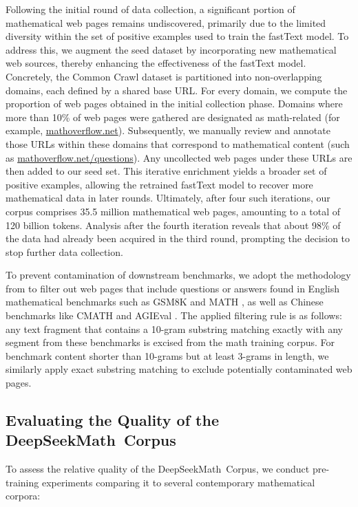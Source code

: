 Following the initial round of data collection, a significant portion of mathematical web pages remains undiscovered, primarily due to the limited diversity within the set of positive examples used to train the fastText model. To address this, we augment the seed dataset by incorporating new mathematical web sources, thereby enhancing the effectiveness of the fastText model. Concretely, the Common Crawl dataset is partitioned into non-overlapping domains, each defined by a shared base URL. For every domain, we compute the proportion of web pages obtained in the initial collection phase. Domains where more than 10\% of web pages were gathered are designated as math-related (for example, \url{mathoverflow.net}). Subsequently, we manually review and annotate those URLs within these domains that correspond to mathematical content (such as \url{mathoverflow.net/questions}). Any uncollected web pages under these URLs are then added to our seed set. This iterative enrichment yields a broader set of positive examples, allowing the retrained fastText model to recover more mathematical data in later rounds. Ultimately, after four such iterations, our corpus comprises 35.5 million mathematical web pages, amounting to a total of 120 billion tokens. Analysis after the fourth iteration reveals that about 98\% of the data had already been acquired in the third round, prompting the decision to stop further data collection.

To prevent contamination of downstream benchmarks, we adopt the methodology from \cite{deepseek-coder} to filter out web pages that include questions or answers found in English mathematical benchmarks such as GSM8K \citep{gsm8k} and MATH \citep{MATH}, as well as Chinese benchmarks like CMATH \citep{wei2023cmath} and AGIEval \citep{agieval}. The applied filtering rule is as follows: any text fragment that contains a 10-gram substring matching exactly with any segment from these benchmarks is excised from the math training corpus. For benchmark content shorter than 10-grams but at least 3-grams in length, we similarly apply exact substring matching to exclude potentially contaminated web pages.

\subsection{Evaluating the Quality of the DeepSeekMath~Corpus}

To assess the relative quality of the DeepSeekMath~Corpus, we conduct pre-training experiments comparing it to several contemporary mathematical corpora:

